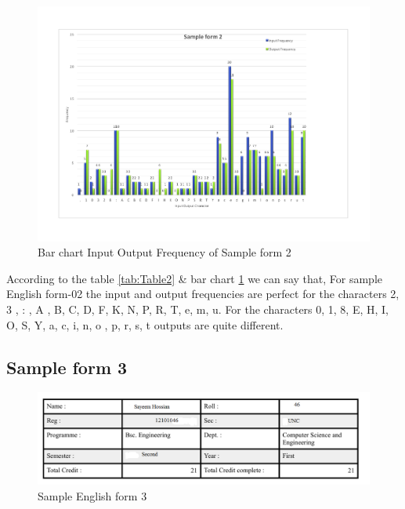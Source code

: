\begin{figure}[H]
\centering
\includegraphics[width=1\textwidth]{form2.pdf}
\caption {Bar chart Input Output Frequency of Sample form 2}
\label {fig:bar2}
\end{figure}
According to the table \ref{tab:Table2} \& bar chart \ref{fig:bar2} we can say that, For sample English form-02 the input and output frequencies are perfect for the characters 2, 3 , :  , A , B, C, D, F, K, N, P, R, T, e, m, u. For the characters 0, 1, 8, E, H, I, O, S, Y, a, c, i, n, o , p, r, s, t outputs are quite different. 
\subsection{Sample form 3}

\begin{figure}[H]
\centering
\includegraphics[width=1\textwidth]{form3.png}
\caption {Sample English form 3}
\label {fig:form3}
\end{figure}

